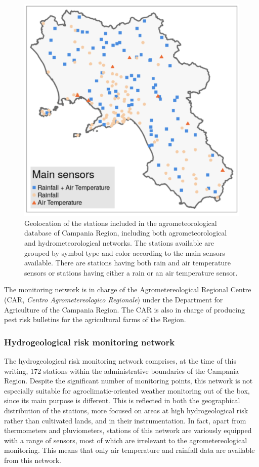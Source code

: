 \documentclass[authoryear,preprint,review,12pt]{elsarticle}
\begin{document}
\begin{figure}
	\centering
    \includegraphics[scale=0.6]{figures/map_stations.png}
	\caption{ Geolocation of the stations included in the agrometeorological database of Campania Region, including both agrometeorological and hydrometeorological networks. 
    The stations available are grouped by symbol type and color according to the main sensors available. There are stations having both rain and air temperature sensors or stations having either a rain or an air temperature sensor.}
	\label{fig:rarLocations}
\end{figure}

The monitoring network is in charge of the Agrometereological Regional Centre (CAR, \emph{Centro Agrometereologico Regionale}) under the Department for Agriculture of the Campania Region. The CAR is also in charge of producing pest risk bulletins for the agricultural farms of the Region.

\subsubsection{Hydrogeological risk monitoring network\label{DPCNetwork}}
The hydrogeological risk monitoring network comprises, at the time of this writing, 172 stations within the administrative boundaries of the Campania Region.
Despite the significant number of monitoring points, this network is not especially suitable for agroclimatic-oriented weather monitoring out of the box, since its main purpose is different.
This is reflected in both the geographical distribution of the stations, more focused on areas at high hydrogeological risk rather than cultivated lands, and in their instrumentation.
In fact, apart from thermometers and pluviometers, stations of this network are variously equipped with a range of sensors, most of which are irrelevant to the agrometereological monitoring.
This means that only air temperature and rainfall data are available from this network.
\end{document}
